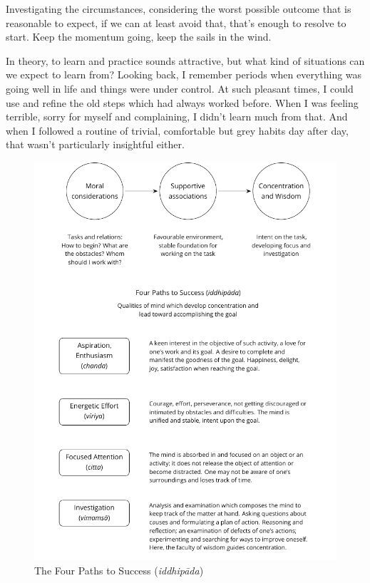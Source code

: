 Investigating the circumstances, considering the worst possible outcome
that is reasonable to expect, if we can at least avoid that, that's
enough to resolve to start. Keep the momentum going, keep the sails in
the wind.

In theory, to learn and practice sounds attractive, but what kind of
situations can we expect to learn from? Looking back, I remember periods
when everything was going well in life and things were under control. At
such pleasant times, I could use and refine the old steps which had
always worked before. When I was feeling terrible, sorry for myself and
complaining, I didn't learn much from that. And when I followed a
routine of trivial, comfortable but grey habits day after day, that
wasn't particularly insightful either.

\clearpage
\null\vfill

\begin{figure}[h]
\caption{The Four Paths to Success (\emph{iddhipāda})}\label{fig-success}

\centering

\includegraphics[width=\linewidth]{./manuscript/tex/diagrams/paths-to-success.pdf}

\end{figure}

